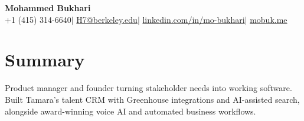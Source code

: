 \documentclass[a4paper,10pt]{article}
\begin{document}
\begin{center}
  {\LARGE\bfseries Mohammed Bukhari}\\[3pt]
  +1 (415) 314-6640\enspace$|$\enspace
  \href{mailto:H7@berkeley.edu}{H7@berkeley.edu}\enspace$|$\enspace
  \href{https://www.linkedin.com/in/mo-bukhari/}{linkedin.com/in/mo-bukhari}\enspace$|$\enspace
  \href{https://mobuk.me}{mobuk.me}
\end{center}
\vspace{-5pt}

\section{Summary}
Product manager and founder turning stakeholder needs into working software. Built Tamara's talent CRM with Greenhouse integrations and AI-assisted search, alongside award-winning voice AI and automated business workflows.
\end{document}
